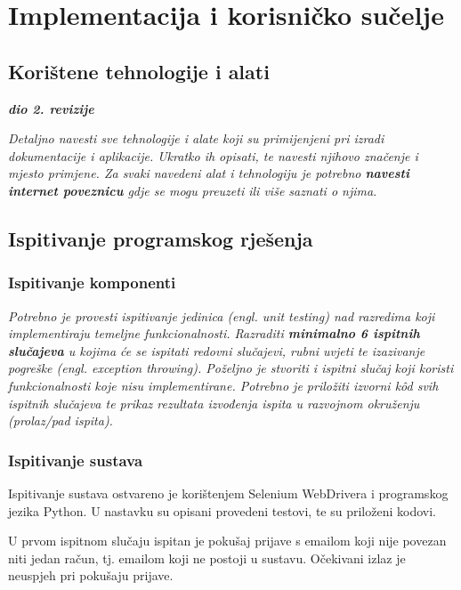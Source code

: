 \chapter{Implementacija i korisničko sučelje}
		
		
		\section{Korištene tehnologije i alati}
		
			\textbf{\textit{dio 2. revizije}}
			
			 \textit{Detaljno navesti sve tehnologije i alate koji su primijenjeni pri izradi dokumentacije i aplikacije. Ukratko ih opisati, te navesti njihovo značenje i mjesto primjene. Za svaki navedeni alat i tehnologiju je potrebno \textbf{navesti internet poveznicu} gdje se mogu preuzeti ili više saznati o njima}.
			
			
			\eject 
		
	
		\section{Ispitivanje programskog rješenja}
					
			\subsection{Ispitivanje komponenti}
			\textit{Potrebno je provesti ispitivanje jedinica (engl. unit testing) nad razredima koji implementiraju temeljne funkcionalnosti. Razraditi \textbf{minimalno 6 ispitnih slučajeva} u kojima će se ispitati redovni slučajevi, rubni uvjeti te izazivanje pogreške (engl. exception throwing). Poželjno je stvoriti i ispitni slučaj koji koristi funkcionalnosti koje nisu implementirane. Potrebno je priložiti izvorni kôd svih ispitnih slučajeva te prikaz rezultata izvođenja ispita u razvojnom okruženju (prolaz/pad ispita). }
			
			
			
			\subsection{Ispitivanje sustava}
			
			Ispitivanje sustava ostvareno je korištenjem Selenium WebDrivera i programskog jezika Python. U nastavku su opisani provedeni testovi, te su priloženi kodovi.
			
			U prvom ispitnom slučaju ispitan je pokušaj prijave s emailom koji nije povezan niti jedan račun, tj. emailom koji ne postoji u sustavu. Očekivani izlaz je neuspjeh pri pokušaju prijave.
			

